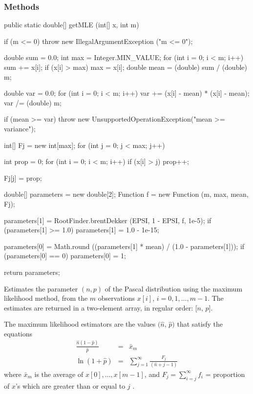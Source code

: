 \subsubsection* {Methods}
\begin{code}

   public static double[] getMLE (int[] x, int m)\begin{hide} {
      if (m <= 0)
         throw new IllegalArgumentException ("m <= 0");

      double sum = 0.0;
      int max = Integer.MIN_VALUE;
      for (int i = 0; i < m; i++)
      {
         sum += x[i];
         if (x[i] > max)
            max = x[i];
      }
      double mean = (double) sum / (double) m;

      double var = 0.0;
      for (int i = 0; i < m; i++)
         var += (x[i] - mean) * (x[i] - mean);
      var /= (double) m;

      if (mean >= var)
           throw new UnsupportedOperationException("mean >= variance");

      int[] Fj = new int[max];
      for (int j = 0; j < max; j++) {
         int prop = 0;
         for (int i = 0; i < m; i++)
            if (x[i] > j)
               prop++;

         Fj[j] = prop;
      }

      double[] parameters = new double[2];
      Function f = new Function (m, max, mean, Fj);

      parameters[1] = RootFinder.brentDekker (EPSI, 1 - EPSI, f, 1e-5);
      if (parameters[1] >= 1.0)
         parameters[1] = 1.0 - 1e-15;

      parameters[0] = Math.round ((parameters[1] * mean) / (1.0 - parameters[1]));
      if (parameters[0] == 0)
          parameters[0] = 1;

      return parameters;
   }\end{hide}
\end{code}
\begin{tabb}
   Estimates the parameter $(n, p)$ of the Pascal distribution
   using the maximum likelihood method, from the $m$ observations
   $x[i]$, $i = 0, 1, \ldots, m-1$. The estimates are returned in a two-element
    array, in regular order: [$n$, $p$].
   \begin{detailed}
   The maximum likelihood estimators are the values $(\hat{n}$, $\hat{p})$
  that  satisfy the equations
   \begin{eqnarray*}
      \frac{\hat{n}(1 - \hat{p})}{\hat{p}} & = & \bar{x}_m\\
      \ln (1 + \hat{p}) & = & \sum_{j=1}^{\infty} \frac{F_j}{(\hat{n} + j - 1)}
   \end{eqnarray*}
   where  $\bar x_m$ is the average of $x[0],\dots,x[m-1]$, and
   $F_j = \sum_{i=j}^{\infty} f_i$ = proportion of $x$'s which are
   greater than or equal to $j$
   \cite[page 132]{tJOH69a}.
   \end{detailed}
\end{tabb}
